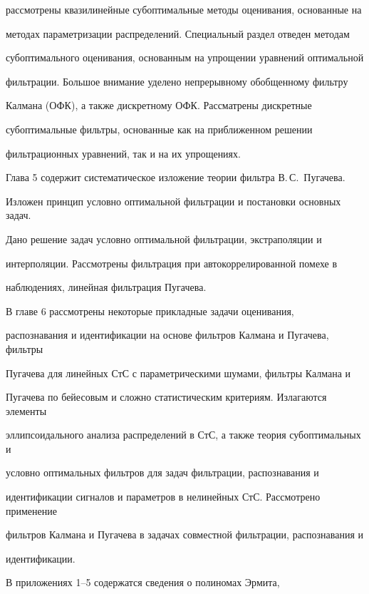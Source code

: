 рассмотрены квазилинейные субоптимальные методы оценивания, основанные на 


методах параметризации распределений. Специальный раздел отведен методам 


субоптимального оценивания, основанным на упрощении уравнений оптимальной 


фильтрации.  Большое внимание уделено непрерывному обобщенному фильтру 


Калмана (ОФК), а также дискретному ОФК. Рассматрены дискретные 


субоптимальные фильтры, основанные как на приближенном решении 


фильтрационных уравнений, так и на их упрощениях.


     


     Глава 5 содержит систематическое изложение теории фильтра В.\,С.~Пугачева. 


Изложен принцип условно оптимальной фильтрации и постановки основных задач. 


Дано решение задач условно оптимальной фильтрации, экстраполяции и 


интерполяции. Рассмотрены фильтрация при автокоррелированной помехе в 


наблюдениях, линейная фильтрация Пугачева. 


     


     В главе 6 рассмотрены некоторые прикладные задачи оценивания, 


распознавания и идентификации на основе фильтров Калмана и Пугачева, фильтры 


Пугачева для линейных СтС с параметрическими шумами, фильтры Калмана и 


Пугачева по бейесовым и сложно статистическим критериям. Излагаются элементы 


эллипсоидального анализа распределений в СтС, а также теория субоптимальных и 


условно оптимальных фильтров для задач фильтрации, распознавания и 


идентификации сигналов и параметров в нелинейных СтС. Рассмотрено применение 


фильтров Калмана и Пугачева в задачах совместной фильтрации, распознавания и 


идентификации.


     


     В приложениях 1--5 содержатся сведения о полиномах Эрмита, 


